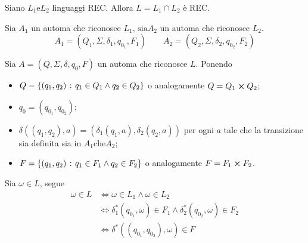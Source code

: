 \documentclass{subfiles}
\begin{document}
\begin{Theorem}
    Siano \(L_{1} \text{e} L_{2}\) linguaggi REC. Allora \(L = L_{1} \cap L_{2}\) è REC.

    \begin{Proof*}
        Sia \(A_{1}\) un automa che riconosce \(L_{1} \text{, sia} A_{2}\) un automa che riconosce \(L_{2}\).
        \[
            A_{1} = (Q_{1}, \Sigma, \delta_{1}, q_{0_{1}}, F_{1}) \qquad A_{2} = (Q_{2}, \Sigma, \delta_{2}, q_{0_{2}}, F_{2})
        \]

        \noindent Sia \(A = (Q, \Sigma, \delta, q_{0}, F)\) un automa che riconosce \(L\). Ponendo
        \begin{itemize}
            \item \(Q = \left\{(q_{1}, q_{2}) \operatorname{\: {:} \:} q_{1} \in Q_{1} \land q_{2} \in Q_{2}\right\}\) o analogamente \(Q = Q_{1} \cp Q_{2}\);
            \item \(q_{0} = (q_{0_{1}}, q_{0_{2}})\);
            \item \(\delta((q_{1}, q_{2}), a) = (\delta_{1}(q_{1}, a), \delta_{2}(q_{2}, a))\) per ogni \(a\) tale che la transizione sia definita sia in \(A_{1} \text{che} A_{2}\);
            \item \(F = \left\{(q_{1}, q_{2}) \operatorname{\: {:} \:} q_{1} \in F_{1} \land q_{2} \in F_{2}\right\}\) o analogamente \(F = F_{1} \cp F_{2}\).
        \end{itemize}

        \noindent Sia \(\omega \in L\), segue
        \[\begin{aligned}
                \omega \in L & \iff \omega \in L_{1} \land \omega \in L_{2}                                                       \\
                             & \iff \delta_{1}^{*}(q_{0_{1}}, \omega) \in F_{1} \land \delta_{2}^{*}(q_{0_{2}}, \omega) \in F_{2} \\
                             & \iff \delta^{*}((q_{0_{1}}, q_{0_{2}}), \omega) \in F
            \end{aligned}\]
    \end{Proof*}
\end{Theorem}
\clearpage
\end{document}
